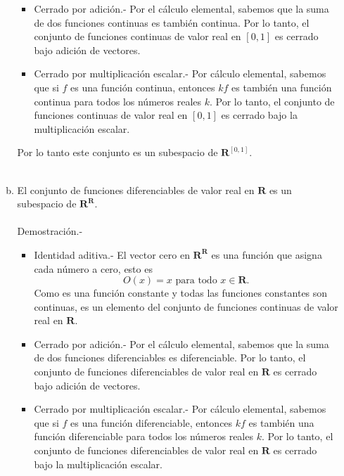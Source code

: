 \begin{enumerate}[\bfseries 1.]
\begin{enumerate}[(a)]
\begin{itemize}
		    \item Cerrado por adición.-\; Por el cálculo elemental, sabemos que la suma de dos funciones continuas es también continua. Por lo tanto, el conjunto de funciones continuas de valor real en $[0,1]$ es cerrado bajo adición de vectores.

		    \item Cerrado por multiplicación escalar.-\; Por cálculo elemental, sabemos que si $f$ es una función continua, entonces $kf$ es también una función continua para todos los números reales $k$. Por lo tanto, el conjunto de funciones continuas de valor real en $[0,1]$ es cerrado bajo la multiplicación escalar.
		\end{itemize}
		Por lo tanto este conjunto es un subespacio de $\textbf{R}^{[0,1]}$.\\\\

	    \item El conjunto de funciones diferenciables de valor real en $\textbf{R}$ es un subespacio de $\textbf{R}^{\textbf{R}}.$\\\\
		Demostración.-\; 
		\begin{itemize}
		    \item Identidad aditiva.-\; El vector cero en $\textbf{R}^{\textbf{R}}$ es una función que asigna cada número a cero, esto es
		    $$O(x)=x\mbox{ para todo }x\in \textbf{R}.$$
		    Como es una función constante y todas las funciones constantes son continuas, es un elemento del conjunto de funciones continuas de valor real en $\textbf{R}$.

		    \item Cerrado por adición.-\; Por el cálculo elemental, sabemos que la suma de dos funciones diferenciables es diferenciable. Por lo tanto, el conjunto de funciones diferenciables de valor real en $\textbf{R}$ es cerrado bajo adición de vectores.

		    \item Cerrado por multiplicación escalar.-\; Por cálculo elemental, sabemos que si $f$ es una función diferenciable, entonces $kf$ es también una función diferenciable para todos los números reales $k$. Por lo tanto, el conjunto de funciones diferenciables de valor real en $\textbf{R}$ es cerrado bajo la multiplicación escalar.\\\\
		\end{itemize}


\end{enumerate}
\end{enumerate}
